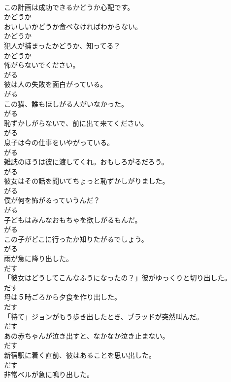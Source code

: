 \documentclass[8pt]{extreport}
\begin{document}
\begin{CJK}{UTF8}{min}
\\	この計画は成功できるかどうか心配です。	
\\	かどうか
\\	おいしいかどうか食べなければわからない。	
\\	かどうか
\\	犯人が捕まったかどうか、知ってる？	
\\	かどうか
\\	怖がらないでください。	
\\	がる
\\	彼は人の失敗を面白がっている。	
\\	がる
\\	この猫、誰もほしがる人がいなかった。	
\\	がる
\\	恥ずかしがらないで、前に出て来てください。	
\\	がる
\\	息子は今の仕事をいやがっている。	
\\	がる
\\	雑誌のほうは彼に渡してくれ。おもしろがるだろう。	
\\	がる
\\	彼女はその話を聞いてちょっと恥ずかしがりました。	
\\	がる
\\	僕が何を怖がるっていうんだ？	
\\	がる
\\	子どもはみんなおもちゃを欲しがるもんだ。	
\\	がる
\\	この子がどこに行ったか知りたがるでしょう。	
\\	がる
\\	雨が急に降り出した。	
\\	だす
\\	「彼女はどうしてこんなふうになったの？」彼がゆっくりと切り出した。	
\\	だす
\\	母は５時ごろから夕食を作り出した。	
\\	だす
\\	「待て」ジョンがもう歩き出したとき、ブラッドが突然叫んだ。	
\\	だす
\\	あの赤ちゃんが泣き出すと、なかなか泣き止まない。	
\\	だす
\\	新宿駅に着く直前、彼はあることを思い出した。	
\\	だす
\\	非常ベルが急に鳴り出した。	

\end{CJK}
\end{document}
